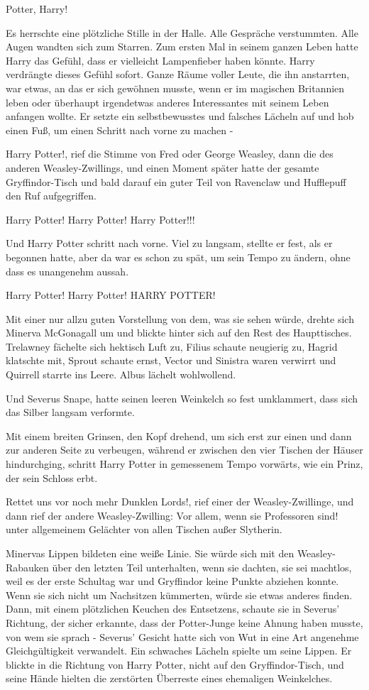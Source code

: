 \glqq{}Potter, Harry!\grqq{}

Es herrschte eine plötzliche Stille in der Halle. Alle Gespräche verstummten.
Alle Augen wandten sich zum Starren. Zum ersten Mal in seinem ganzen Leben hatte
Harry das Gefühl, dass er vielleicht Lampenfieber haben könnte. Harry verdrängte
dieses Gefühl sofort. Ganze Räume voller Leute, die ihn anstarrten, war etwas,
an das er sich gewöhnen musste, wenn er im magischen Britannien leben oder
überhaupt irgendetwas anderes Interessantes mit seinem Leben anfangen wollte. Er
setzte ein selbstbewusstes und falsches Lächeln auf und hob einen Fuß, um einen
Schritt nach vorne zu machen -

\glqq{}Harry Potter!\grqq{}, rief die Stimme von Fred oder George Weasley, dann
die des anderen Weasley-Zwillings, und einen Moment später hatte der gesamte
Gryffindor-Tisch und bald darauf ein guter Teil von Ravenclaw und Hufflepuff den
Ruf aufgegriffen.

\glqq{}Harry Potter! Harry Potter! Harry Potter!!!\grqq{}

Und Harry Potter schritt nach vorne. Viel zu langsam, stellte er fest, als er
begonnen hatte, aber da war es schon zu spät, um sein Tempo zu ändern, ohne dass
es unangenehm aussah.

\glqq{}Harry Potter! Harry Potter! HARRY POTTER!\grqq{}

Mit einer nur allzu guten Vorstellung von dem, was sie sehen würde, drehte sich
Minerva McGonagall um und blickte hinter sich auf den Rest des Haupttisches.
Trelawney fächelte sich hektisch Luft zu, Filius schaute neugierig zu, Hagrid
klatschte mit, Sprout schaute ernst, Vector und Sinistra waren verwirrt und
Quirrell starrte ins Leere. Albus lächelt wohlwollend.

Und Severus Snape, hatte seinen leeren Weinkelch so fest umklammert, dass sich
das Silber langsam verformte.

Mit einem breiten Grinsen, den Kopf drehend, um sich erst zur einen und dann zur
anderen Seite zu verbeugen, während er zwischen den vier Tischen der Häuser
hindurchging, schritt Harry Potter in gemessenem Tempo vorwärts, wie ein Prinz,
der sein Schloss erbt.

\glqq{}Rettet uns vor noch mehr Dunklen Lords!\grqq{}, rief einer der
Weasley-Zwillinge, und dann rief der andere Weasley-Zwilling: \glqq{}Vor allem,
wenn sie Professoren sind!\grqq{} unter allgemeinem Gelächter von allen Tischen
außer Slytherin.

Minervas Lippen bildeten eine weiße Linie. Sie würde sich mit den
Weasley-Rabauken über den letzten Teil unterhalten, wenn sie dachten, sie sei
machtlos, weil es der erste Schultag war und Gryffindor keine Punkte abziehen
konnte. Wenn sie sich nicht um Nachsitzen kümmerten, würde sie etwas anderes
finden. Dann, mit einem plötzlichen Keuchen des Entsetzens, schaute sie in
Severus' Richtung, der sicher erkannte, dass der Potter-Junge keine Ahnung haben
musste, von wem sie sprach - Severus' Gesicht hatte sich von Wut in eine Art
angenehme Gleichgültigkeit verwandelt. Ein schwaches Lächeln spielte um seine
Lippen. Er blickte in die Richtung von Harry Potter, nicht auf den
Gryffindor-Tisch, und seine Hände hielten die zerstörten Überreste eines
ehemaligen Weinkelches.

